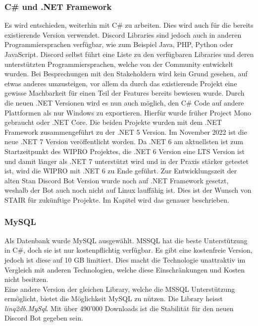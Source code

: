 \documentclass[a4paper, table]{article}
\begin{document}
\subsubsection{C\# und .NET Framework}
Es wird entschieden, weiterhin mit C\# zu arbeiten. 
Dies wird auch für die bereits existierende Version verwendet. 
Discord Libraries sind jedoch auch in anderen Programmiersprachen verfügbar, wie zum Beispiel Java, PHP, Python oder JavaScript. \autocite{noauthor_discord_nodate-1} 
Discord selbst führt eine Liste zu den verfügbaren Libraries und deren unterstützten Programmiersprachen, welche von der Community entwickelt wurden.\autocite{noauthor_discord_2022-1}
Bei Besprechungen mit den Stakeholdern wird kein Grund gesehen, auf etwas anderes umzusteigen, vor allem da durch das existierende Projekt eine gewisse Machbarkeit für einen Teil der Features bereits bewiesen wurde. 
Durch die neuen .NET Versionen wird es nun auch möglich, den C\# Code auf andere Plattformen als nur Windows zu exportieren. 
Hierfür wurde früher Project Mono gebraucht oder .NET Core. 
Die beiden Projekte wurden mit dem .NET Framework zusammengeführt zu der .NET 5 Version.\autocite{schwichtenberg_net_2019}
Im November 2022 ist die neue .NET 7 Version veröffentlicht worden. 
Da .NET 6 am aktuellsten ist zum Startzeitpunkt des WIPRO Projektes, die .NET 6 Version eine LTS Version ist und damit länger als .NET 7 unterstützt wird und in der Praxis stärker getestet ist, wird die WIPRO mit .NET 6 zu Ende geführt.\autocite{noauthor_net_2022}
Zur Entwicklungszeit der alten Stan Discord Bot Version wurde noch auf .NET Framework gesetzt, weshalb der Bot auch noch nicht auf Linux lauffähig ist. 
Dies ist der Wunsch von STAIR für zukünftige Projekte. 
Im Kapitel  wird das genauer beschrieben.

\subsubsection{MySQL}
Als Datenbank wurde MySQL ausgewählt. 
MSSQL hat die beste Unterstützung in C\#, doch sie ist nur kostenpflichtig verfügbar. 
Es gibt eine kostenfreie Version, jedoch ist diese auf 10 GB limitiert. 
Dies macht die Technologie unattraktiv im Vergleich mit anderen Technologien, welche diese Einschränkungen und Kosten nicht besitzen.\autocite{noauthor_sql_nodate}\\
Eine andere Version der gleichen Library, welche die MSSQL Unterstützung ermöglicht, bietet die Möglichkeit MySQL zu nützen. 
Die Library heisst \textit{linq2db.MySql}.
Mit über 490’000 Downloads ist die Stabilität für den neuen Discord Bot gegeben sein.\autocite{noauthor_linq2dbmysql_nodate}
\end{document}
